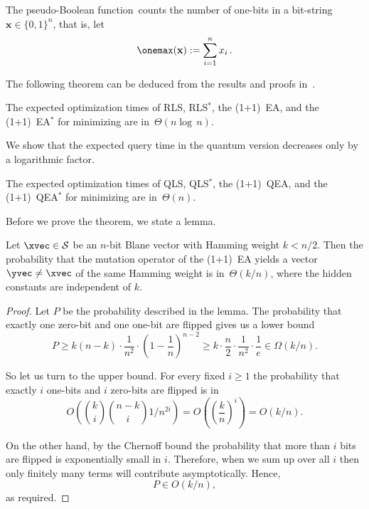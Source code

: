 The pseudo-Boolean function~\onemax counts the number of one-bits in a bit-string~$\mathbf{x}\in\{0,1\}^n$, that is, let
\begin{equation}
\onemax(\mathbf{x}):=\sum_{i=1}^n x_i\,.
\end{equation}

The following theorem can be deduced from the results and proofs in~\cite{DJWoneone}.
\begin{theorem}\label{thm:onemaxclassic}
The expected optimization times of RLS, RLS$^*$, the (1+1)~EA, and the (1+1)~EA$^*$ for minimizing \onemax are in~$\Theta(n\log\,n)$.
\end{theorem}

We show that the expected query time in the quantum version decreases only by a logarithmic factor.
\begin{theorem}\label{thm:onemaxquantum}
The expected optimization times of QLS, QLS$^*$, the (1+1)~QEA, and the (1+1)~QEA$^*$ for minimizing \onemax are in~$\Theta(n)$.
\end{theorem}

Before we prove the theorem, we state a lemma.

\begin{lemma}\label{lem:MovingAlongLayer}
Let $\xvec \in \mathcal{S}$ be an $n$-bit Blane vector with Hamming weight $k < n/2$. Then the probability that the mutation operator of the (1+1)~EA yields a vector $\yvec \neq \xvec$ of the same Hamming weight is in~$\Theta(k/n)$, where the hidden constants are independent of $k$.
\end{lemma}

\begin{proof}
Let $P$ be the probability described in the lemma. The probability that exactly one zero-bit and one one-bit are flipped gives us a lower bound
\[
P \ge k(n-k)\cdot \frac{1}{n^2}\cdot \left(1-\frac{1}{n}\right)^{n-2} \ge k\cdot \frac{n}{2}\cdot \frac{1}{n^2}\cdot \frac{1}{e} \in \Omega(k/n).
\] 

So let us turn to the upper bound. For every fixed $i\geq 1$ the probability that exactly $i$ one-bits and $i$ zero-bits are flipped is in 
\[
O\left(\binom{k}{i}\binom{n-k}{i}1/n^{2i}\right) = O\left(\left(\frac{k}{n}\right)^i\right) = O(k/n).
\]

On the other hand, by the Chernoff bound the probability that more than $i$ bits are flipped is exponentially small in $i$. Therefore, when we sum up over all $i$ then only finitely many terms will contribute asymptotically. Hence, 
\[
P\in O(k/n),
\]
as required.


\end{proof}

